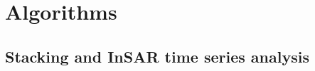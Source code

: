 
\section{Algorithms}


\subsection{Stacking and InSAR time series analysis}
\label{sec:ch4-method-compare}

